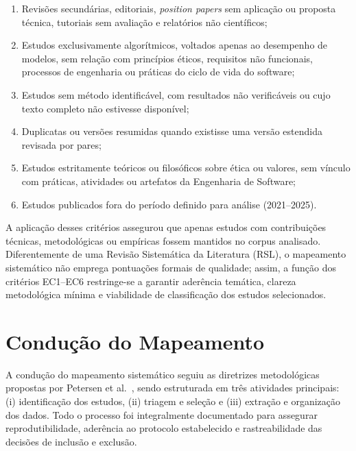 \begin{enumerate}
    \item[(EC1)] Revisões secundárias, editoriais, \textit{position papers} sem aplicação ou proposta técnica, tutoriais sem avaliação e relatórios não científicos;
    
    \item[(EC2)] Estudos exclusivamente algorítmicos, voltados apenas ao desempenho de modelos, sem relação com princípios éticos, requisitos não funcionais, processos de engenharia ou práticas do ciclo de vida do software;
    
    \item[(EC3)] Estudos sem método identificável, com resultados não verificáveis ou cujo texto completo não estivesse disponível;
    
    \item[(EC4)] Duplicatas ou versões resumidas quando existisse uma versão estendida revisada por pares;
    
    \item[(EC5)] Estudos estritamente teóricos ou filosóficos sobre ética ou valores, sem vínculo com práticas, atividades ou artefatos da Engenharia de Software;
    
    \item[(EC6)] Estudos publicados fora do período definido para análise (2021--2025).
\end{enumerate}

A aplicação desses critérios assegurou que apenas estudos com contribuições técnicas, metodológicas ou empíricas fossem mantidos no corpus analisado. Diferentemente de uma Revisão Sistemática da Literatura (RSL), o mapeamento sistemático não emprega pontuações formais de qualidade; assim, a função dos critérios EC1--EC6 restringe-se a garantir aderência temática, clareza metodológica mínima e viabilidade de classificação dos estudos selecionados.

\section{Condução do Mapeamento}

A condução do mapeamento sistemático seguiu as diretrizes metodológicas propostas por Petersen et al.~\cite{Petersen2015}, sendo estruturada em três atividades principais: (i) identificação dos estudos, (ii) triagem e seleção e (iii) extração e organização dos dados. Todo o processo foi integralmente documentado para assegurar reprodutibilidade, aderência ao protocolo estabelecido e rastreabilidade das decisões de inclusão e exclusão.

